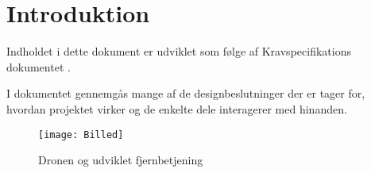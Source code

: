 \documentclass[Main]{Subfiles}
\begin{document}
\chapter{Introduktion}
Indholdet i dette dokument er udviklet som følge af Kravspecifikations dokumentet \cite{KravSpec}.

I dokumentet gennemgås mange af de designbeslutninger der er tager for, hvordan projektet virker og de enkelte dele interagerer med hinanden.


\begin{figure}[H]
\centering
\texttt{[image: Billed]}
\caption{Dronen og udviklet fjernbetjening}
\end{figure}
\end{document}
